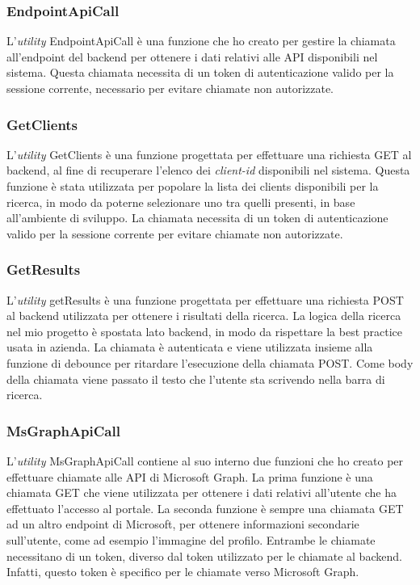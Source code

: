 \subsubsection{EndpointApiCall}\label{subsubsec:endpoint-api-call}
L'\textit{utility} EndpointApiCall è una funzione che ho creato per gestire la chiamata all'endpoint del backend per ottenere
i dati relativi alle API disponibili nel sistema.
Questa chiamata necessita di un token di autenticazione valido per la sessione corrente, necessario per evitare chiamate non autorizzate.

\subsubsection{GetClients}\label{subsubsec:get-clients}
L'\textit{utility} GetClients è una funzione progettata per effettuare una richiesta GET al backend, al fine di recuperare 
l'elenco dei \textit{client-id} disponibili nel sistema. Questa funzione è stata utilizzata per popolare la lista dei clients disponibili
per la ricerca, in modo da poterne selezionare uno tra quelli presenti, in base all'ambiente di sviluppo.
La chiamata necessita di un token di autenticazione valido per la sessione corrente per evitare chiamate non autorizzate.

\subsubsection{GetResults}\label{subsubsec:get-results}
L'\textit{utility} getResults è una funzione progettata per effettuare una richiesta POST al backend utilizzata per ottenere i risultati della ricerca. 
La logica della ricerca nel mio progetto è spostata lato backend, in modo da rispettare la best practice usata in azienda.
La chiamata è autenticata e viene utilizzata insieme alla funzione di debounce per ritardare l'esecuzione della chiamata POST. Come body della chiamata
viene passato il testo che l'utente sta scrivendo nella barra di ricerca.

\subsubsection{MsGraphApiCall}\label{subsubsec:ms-graph-api-call}
L'\textit{utility} MsGraphApiCall contiene al suo interno due funzioni che ho creato per effettuare chiamate alle API di Microsoft Graph. 
La prima funzione è una chiamata GET che viene utilizzata per ottenere i dati relativi all'utente che ha effettuato l'accesso al portale.
La seconda funzione è sempre una chiamata GET ad un altro endpoint di Microsoft, per ottenere informazioni secondarie sull'utente, come ad esempio l'immagine del profilo.
Entrambe le chiamate necessitano di un token, diverso dal token utilizzato per le chiamate al backend. Infatti, questo token è specifico per le chiamate verso Microsoft Graph.

